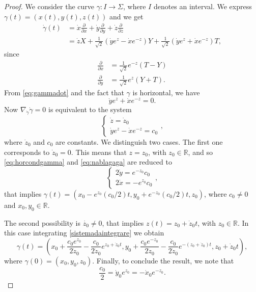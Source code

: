 \documentclass[10pt]{amsart}
\theoremstyle{definition}
\theoremstyle{remark}
\numberwithin{equation}{section}
\begin{document}
\begin{proof} We consider the curve ${\gamma}:I\rightarrow {\Sigma}$, where $I$ denotes an interval. We express ${\gamma}(t)=(x(t),y(t),z(t))$ and we get
\begin{equation}\label{eq:gammadot}
\begin{split}
\dot{\gamma}(t)&=\dot{x} \frac{\partial}{\partial x}+\dot{y} \frac{\partial}{\partial y}+\dot{z} \frac{\partial}{\partial z}\\
&=\dot{z} X+\frac{1}{\sqrt{2}}(\dot{y}e^z-\dot{x}e^{-z})Y+\frac{1}{\sqrt{2}}(\dot{y}e^z+\dot{x}e^{-z})T,
\end{split}
\end{equation}
since 
\begin{equation*}
\begin{split}
\frac{\partial}{\partial x}&=\frac{1}{\sqrt{2}}e^{-z}(T-Y)\\
\frac{\partial}{\partial y}&=\frac{1}{\sqrt{2}}e^{z}(Y+T).
\end{split}
\end{equation*}
From \eqref{eq:gammadot} and the fact that ${\gamma}$ is horizontal, we have
\begin{equation}\label{eq:horcondgamma}
\dot{y}e^z+\dot{x}e^{-z}=0.
\end{equation}
Now ${\nabla}_{\dot{\gamma}}\dot{\gamma}=0$ is equivalent to the system
\begin{equation}\label{eq:nablagaga}
 \begin{cases}
\dot{z}=\dot{z}_0 \\
\dot{y}e^z-\dot{x}e^{-z}=c_0
\end{cases},
\end{equation}
where $\dot{z}_0$ and $c_0$ are constants. We distinguish two cases. The first one corresponds to $\dot{z}_0=0$. This means that $z=z_0$, with $z_0\in{{\mathbb{R}}}$, and so \eqref{eq:horcondgamma} and \eqref{eq:nablagaga} are reduced to
\begin{equation}\label{sistemadaintegrare}
\begin{cases}
2\dot{y}=e^{-z_0}c_0 \\
2\dot{x}=-e^{z_0}c_0
\end{cases},
\end{equation}
that implies ${\gamma}(t)=(x_0-e^{z_0}(c_0/2) t, y_0+e^{-z_0}(c_0/2) t, z_0)$, where $c_0\neq 0$ and $x_0,y_0\in{{\mathbb{R}}}$. 

The second possibility is $\dot{z_0}\neq 0$, that implies $z(t)=z_0+\dot{z}_0 t$, with $z_0\in{{\mathbb{R}}}$. In this case integrating \eqref{sistemadaintegrare} we obtain
\[
{\gamma}(t)=(x_0+\frac{c_0 e^{z_0}}{2\dot{z}_0}-\frac{c_0}{2\dot{z}_0}e^{z_0+\dot{z}_0t}, y_0+\frac{c_0 e^{-z_0}}{2\dot{z}_0}-\frac{c_0}{2\dot{z}_0}e^{-(z_0+\dot{z}_0)t},
z_0+\dot{z}_0t),
\]
where ${\gamma}(0)=(x_0,y_0,z_0)$. Finally, to conclude the result, we note that 
\[
\frac{c_0}{2}=\dot{y}_0e^{z_0}=-\dot{x}_0e^{-z_0}.
\]
\end{proof}
\end{document}

